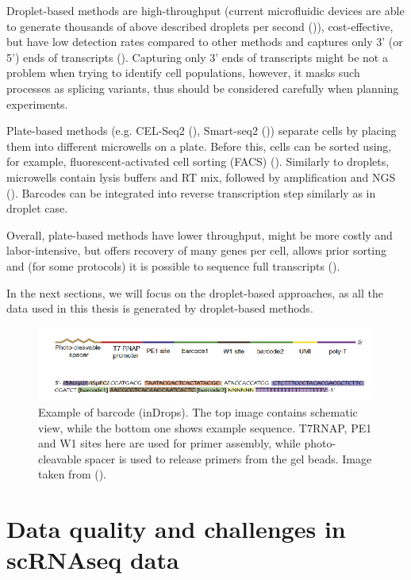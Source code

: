 Droplet-based methods are high-throughput
(current microfluidic devices are able to generate thousands of above described droplets per second (\cite{Prakadan2017})),
cost-effective, but have low detection rates compared to other methods and
captures only 3' (or 5') ends of transcripts (\cite{Heumos2023}).
Capturing only 3' ends of transcripts might be not a problem when trying to identify cell populations,
however, it masks such processes as splicing variants, thus should be considered carefully when planning experiments.

Plate-based methods (e.g. CEL-Seq2 (\cite{Hashimshony2016}), Smart-seq2 (\cite{Picelli2013}))
separate cells by placing them into different microwells on a plate.
Before this, cells can be sorted using, for example, fluorescent-activated cell sorting (FACS) (\cite{Heumos2023}).
Similarly to droplets, microwells contain lysis buffers and RT mix,
followed by amplification and NGS (\cite{Hashimshony2016}).
Barcodes can be integrated into reverse transcription step similarly as in droplet case.

Overall, plate-based methods have lower throughput, might be more costly and labor-intensive,
but offers recovery of many genes per cell, allows prior sorting and
(for some protocols) it is possible to sequence full transcripts (\cite{Heumos2023}).

In the next sections, we will focus on the droplet-based approaches,
as all the data used in this thesis is generated by droplet-based methods.

\begin{figure}
  \centering
  \includegraphics[width=\linewidth]{images/primer.png}
  \caption{Example of barcode (inDrops). The top image contains schematic view, while the bottom one shows example sequence.
           T7RNAP, PE1 and W1 sites here are used for primer assembly,
           while photo-cleavable spacer is used to release primers from the gel beads. Image taken from (\cite{Klein2015}).}
  \label{fig:primer}
\end{figure}

\section{Data quality and challenges in scRNAseq data}

